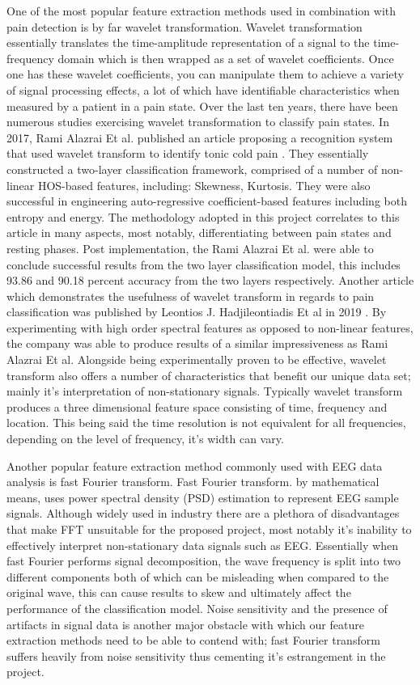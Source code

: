 \documentclass[12pt]{article}
\begin{document}
One of the most popular feature extraction methods used in combination with pain detection is by far wavelet transformation. Wavelet transformation essentially translates the time-amplitude representation of a signal to the time-frequency domain which is then wrapped as a set of wavelet coefficients. Once one has these wavelet coefficients, you can manipulate them to achieve a variety of signal processing effects, a lot of which have identifiable characteristics when measured by a patient in a pain state. Over the last ten years, there have been numerous studies exercising wavelet transformation to classify pain states. In 2017, Rami Alazrai Et al. published an article proposing a recognition system that used wavelet transform to identify tonic cold pain \cite{Alazrai2017EEGbasedTC}. They essentially constructed a two-layer classification framework, comprised of a number of non-linear HOS-based features, including: Skewness, Kurtosis. They were also successful in engineering auto-regressive coefficient-based features including both entropy and energy. The methodology adopted in this project correlates to this article in many aspects, most notably, differentiating between pain states and resting phases. Post implementation, the Rami Alazrai Et al. were able to conclude successful results from the two layer classification model, this includes 93.86 and 90.18 percent accuracy from the two layers respectively. Another article which demonstrates the usefulness of wavelet transform in regards to pain classification was published by Leontios J. Hadjileontiadis Et al in 2019 \cite{7055273}. By experimenting with high order spectral features as opposed to non-linear features, the company was able to produce results of a similar impressiveness as Rami Alazrai Et al. Alongside being experimentally proven to be effective, wavelet transform also offers a number of characteristics that benefit our unique data set; mainly it's interpretation of non-stationary signals. Typically wavelet transform produces a three dimensional feature space consisting of time, frequency and location. This being said the time resolution is not equivalent for all frequencies, depending on the level of frequency, it's width can vary. 

Another popular feature extraction method commonly used with EEG data analysis is fast Fourier transform. Fast Fourier transform. by mathematical means, uses power spectral density (PSD) estimation to represent EEG sample signals. Although widely used in industry there are a plethora of disadvantages that make FFT unsuitable for the proposed project, most notably it's inability to effectively interpret non-stationary data signals such as EEG. Essentially when fast Fourier performs signal decomposition, the wave frequency is split into two different components both of which can be misleading when compared to the original wave, this can cause results to skew and ultimately affect the performance of the classification model. Noise sensitivity and the presence of artifacts in signal data is another major obstacle with which our feature extraction methods need to be able to contend with; fast Fourier transform suffers heavily from noise sensitivity thus cementing it's estrangement in the project.
\end{document}
